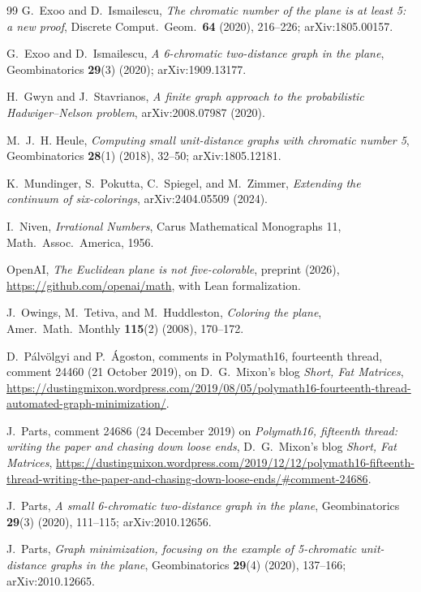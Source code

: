 \documentclass[11pt]{article}
\theoremstyle{definition}
\theoremstyle{remark}
\begin{document}
\begin{thebibliography}{99}
G.~Exoo and D.~Ismailescu,
\emph{The chromatic number of the plane is at least 5: a new proof},
Discrete Comput.\ Geom.\ \textbf{64} (2020), 216--226; arXiv:1805.00157.

G.~Exoo and D.~Ismailescu,
\emph{A 6-chromatic two-distance graph in the plane},
Geombinatorics \textbf{29}(3) (2020); arXiv:1909.13177.

H.~Gwyn and J.~Stavrianos,
\emph{A finite graph approach to the probabilistic Hadwiger--Nelson
problem}, arXiv:2008.07987 (2020).

M.~J.~H. Heule,
\emph{Computing small unit-distance graphs with chromatic number 5},
Geombinatorics \textbf{28}(1) (2018), 32--50; arXiv:1805.12181.

K.~Mundinger, S.~Pokutta, C.~Spiegel, and M.~Zimmer,
\emph{Extending the continuum of six-colorings}, arXiv:2404.05509
(2024).

I.~Niven,
\emph{Irrational Numbers},
Carus Mathematical Monographs 11, Math.\ Assoc.\ America, 1956.

OpenAI,
\emph{The Euclidean plane is not five-colorable}, preprint (2026),
\url{https://github.com/openai/math}, with Lean formalization.

J.~Owings, M.~Tetiva, and M.~Huddleston,
\emph{Coloring the plane}, Amer.\ Math.\ Monthly \textbf{115}(2) (2008),
170--172.

D.~P\'alv\"olgyi and P.~\'Agoston, comments in Polymath16, fourteenth
thread, comment 24460 (21 October 2019), on D.~G.~Mixon's blog
\emph{Short, Fat Matrices},
\url{https://dustingmixon.wordpress.com/2019/08/05/polymath16-fourteenth-thread-automated-graph-minimization/}.

J.~Parts, comment 24686 (24 December 2019) on \emph{Polymath16,
fifteenth thread: writing the paper and chasing down loose ends},
D.~G.~Mixon's blog \emph{Short, Fat Matrices},
\url{https://dustingmixon.wordpress.com/2019/12/12/polymath16-fifteenth-thread-writing-the-paper-and-chasing-down-loose-ends/#comment-24686}.

J.~Parts,
\emph{A small 6-chromatic two-distance graph in the plane},
Geombinatorics \textbf{29}(3) (2020), 111--115; arXiv:2010.12656.

J.~Parts,
\emph{Graph minimization, focusing on the example of 5-chromatic
unit-distance graphs in the plane}, Geombinatorics \textbf{29}(4)
(2020), 137--166; arXiv:2010.12665.


\end{thebibliography}
\end{document}
